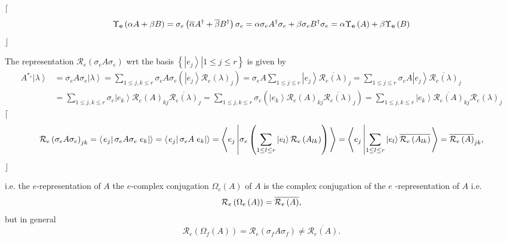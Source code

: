 \documentclass[aps,preprint]{revtex4}
\begin{document}
$\lceil$%
\begin{equation}
\Upsilon_{\mathbf{e}}\left( \alpha A+\beta B\right) =\sigma_{e}\left( 
\overline{\alpha}A^{\dagger}+\overline{\beta}B^{\dagger}\right) \sigma
_{e}=\alpha\sigma_{e}A^{\dagger}\sigma_{e}+\beta\sigma_{e}B^{\dagger}%
\sigma_{e}=\alpha\Upsilon_{\mathbf{e}}\left( A\right) +\beta\Upsilon _{%
\mathbf{e}}\left( B\right)
\end{equation}
$\rfloor$

The representation $\mathcal{R}_{e}\left( \sigma_{e}A\sigma_{e}\right) $ wrt
the basis $\left\{ \left. \left\vert e_{j}\right\rangle \right\vert 1\leq
j\leq r\right\} $ is given by 
\begin{align}
A^{\ast_{e}}\left\vert \lambda\right\rangle & =\sigma_{e}A\sigma
_{e}\left\vert \lambda\right\rangle =\sum_{1\leq j,k\leq
r}\sigma_{e}A\sigma_{e}\left( \left\vert e_{j}\right\rangle \mathcal{R}%
_{e}\left( \lambda\right) _{j}\right) =\sigma_{e}A\sum_{1\leq j\leq
r}\left\vert e_{j}\right\rangle \overline{\mathcal{R}_{e}\left(
\lambda\right) }_{j}=\sum_{1\leq j\leq r}\sigma_{e}A\left\vert
e_{j}\right\rangle \overline {\mathcal{R}_{e}\left( \lambda\right) }_{j} \\
& =\sum_{1\leq j,k\leq r}\sigma_{e}\left\vert e_{k}\right\rangle \mathcal{R}%
_{e}\left( A\right) _{kj}\overline{\mathcal{R}_{e}\left( \lambda\right) }%
_{j}=\sum_{1\leq j,k\leq r}\sigma_{e}\left( \left\vert e_{k}\right\rangle 
\mathcal{R}_{e}\left( A\right) _{kj}\overline {\mathcal{R}_{e}\left(
\lambda\right) }_{j}\right) =\sum_{1\leq j,k\leq r}\left\vert
e_{k}\right\rangle \overline{\mathcal{R}_{e}\left( A\right) }_{kj}\mathcal{R}%
_{e}\left( \lambda\right) _{j}
\end{align}
$\lceil$%
\begin{equation}
\mathcal{R}_{e}\left( \sigma_{e}A\sigma_{e}\right) _{jk}=\left\langle \left.
e_{j}\right\vert \sigma_{e}A\sigma_{e}\left. e_{k}\right\vert \right\rangle
=\left\langle \left. e_{j}\right\vert \sigma_{e}A\left. e_{k}\right\vert
\right\rangle =\left\langle \overset{}{e_{j}}\left\vert \sigma_{e}\left(
\sum_{1\leq l\leq r}\left\vert e_{l}\right\rangle \mathcal{R}_{e}\left(
A_{lk}\right) \right) \right. \right\rangle =\left\langle \overset{}{e_{j}}%
\left\vert \sum_{1\leq l\leq r}\left\vert e_{l}\right\rangle \overline{%
\mathcal{R}_{e}\left( A_{lk}\right) }\right. \right\rangle =\overline{%
\mathcal{R}_{e}\left( A\right) }_{jk},
\end{equation}
$\rfloor$

i.e. the $e$-representation of $A$ the $e$-complex conjugation $\Omega
_{e}\left( A\right) $ of $A$ is the complex conjugation of the $e$%
-representation of $A$ i.e. 
\begin{equation}
\mathcal{R}_{e}\left( \Omega_{e}\left( A\right) \right) =\overline {\mathcal{%
R}_{e}\left( A\right) },
\end{equation}
but in general 
\begin{equation}
\mathcal{R}_{e}\left( \Omega_{f}\left( A\right) \right) =\mathcal{R}%
_{e}\left( \sigma_{f}A\sigma_{f}\right) \neq\overline{\mathcal{R}_{e}\left(
A\right) }.
\end{equation}
\end{document}
